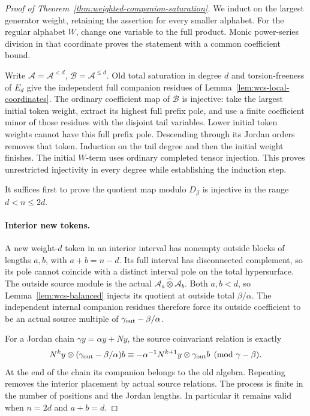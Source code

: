 \documentclass[11pt]{article}
\theoremstyle{definition}\newtheorem{definition}[theorem]{Definition}
\begin{document}
\begin{proof}[Proof of Theorem~\ref{thm:weighted-companion-saturation}]
We induct on the largest generator weight, retaining the
assertion for every smaller alphabet.  For the regular
alphabet \(W\), change one variable to the full product.
Monic power-series division in that coordinate proves the
statement with a common coefficient bound.

Write \(\mathcal A=\mathcal A^{<d}\),
\(\mathcal B=\mathcal A^{\leq d}\).  Old total saturation
in degree \(d\) and torsion-freeness of \(E_d\) give the
independent full companion residues of Lemma~\ref{lem:wcs-local-coordinates}.  The ordinary
coefficient map of \(\mathcal B\) is injective: take the
largest initial token weight, extract its highest full
prefix pole, and use a finite coefficient minor of those
residues with the disjoint tail variables.  Lower initial
token weights cannot have this full prefix pole.
Descending through its Jordan orders removes that token.
Induction on the tail degree and then the initial weight
finishes.  The initial \(W\)-term uses ordinary completed
tensor injection.  This proves unrestricted injectivity
in every degree while establishing the induction step.

It suffices first to prove the quotient map modulo
\(D_\beta\) is injective in the range \(d<n\leq2d\).

\paragraph{Interior new tokens.}
A new weight-\(d\) token in an interior interval has
nonempty outside blocks of lengths \(a,b\), with
\(a+b=n-d\).  Its full interval has disconnected complement,
so its pole cannot coincide with a distinct interval pole
on the total hypersurface.  The outside source module is
the actual \(\mathcal A_a\widehat\otimes\mathcal A_b\).
Both \(a,b<d\), so
Lemma~\ref{lem:wcs-balanced} injects its quotient at outside
total \(\beta/\alpha\).  The independent internal companion
residues therefore force its outside coefficient to be an
actual source multiple of
\(\gamma_{\rm out}-\beta/\alpha\).

For a Jordan chain \(\gamma y=\alpha y+Ny\), the source
coinvariant relation is exactly
\begin{equation}\label{eq:wcs-Jordan}
 N^k y\otimes(\gamma_{\rm out}-\beta/\alpha)b
 \equiv-\alpha^{-1}N^{k+1}y\otimes\gamma_{\rm out}b
                                      \pmod{\gamma-\beta}.
\end{equation}
At the end of the chain its companion belongs to the old
algebra.  Repeating removes the interior placement by
actual source relations.  The process is finite in the
number of positions and the Jordan lengths.  In particular
it remains valid when \(n=2d\) and \(a+b=d\).


\end{proof}
\end{document}
